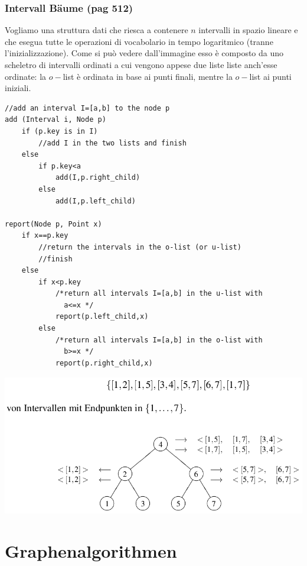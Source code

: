 \documentclass[a4paper]{book}
\newcommand{\lstIndent}{4}
\begin{document}
\subsection{Intervall Bäume (pag 512)}
Vogliamo una struttura dati che riesca a contenere $n$ intervalli in spazio lineare e che esegua tutte le operazioni di vocabolario in tempo logaritmico (tranne l'inizializzazione). Come si può vedere dall'immagine esso è composto da uno scheletro di intervalli ordinati a cui vengono appese due liste liste anch'esse ordinate: la $o-$list è ordinata in base ai punti finali, mentre la $o-$list ai punti iniziali.
\begin{lstlisting}[tabsize=\lstIndent]
//add an interval I=[a,b] to the node p
add (Interval i, Node p)
	if (p.key is in I)
		//add I in the two lists and finish
	else
		if p.key<a
			add(I,p.right_child)
		else
			add(I,p.left_child)	
			
report(Node p, Point x)
	if x==p.key
		//return the intervals in the o-list (or u-list)
		//finish
	else
		if x<p.key
			/*return all intervals I=[a,b] in the u-list with			
			  a<=x */
			report(p.left_child,x)
		else	
			/*return all intervals I=[a,b] in the o-list with			
			  b>=x */ 
			report(p.right_child,x)  
\end{lstlisting}
\begin{center}
\includegraphics[scale=0.4]{Figures/rangetree.png}
\end{center}

\chapter{Graphenalgorithmen}
\end{document}
